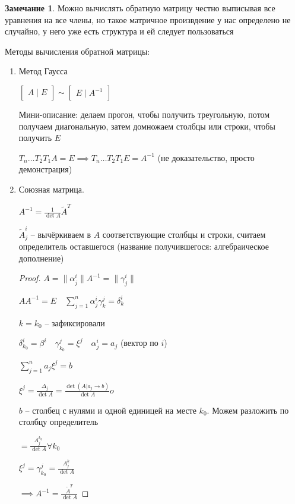 \documentclass{book}
\newcommand{\tl}[1]{\widetilde{#1}}
\theoremstyle{definition}
\newtheorem*{note}{Замечание}
\begin{document}
\begin{note}
    Можно вычислять обратную матрицу честно выписывая все уравнения на все члены, но такое матричное произвдение у нас определено не случайно, у него уже есть структура и ей следует пользоваться
\end{note}

Методы вычисления обратной матрицы:
\begin{enumerate}
    \item Метод Гаусса

        $\begin{bmatrix} A\mid E \end{bmatrix} \sim \begin{bmatrix} E\mid A^{-1} \end{bmatrix} $

         Мини-описание: делаем прогон, чтобы получить треугольную, потом получаем диагональную, затем домножаем столбцы или строки, чтобы получить $E$
         
         $T_n \ldots T_2T_1A = E \implies  T_n\ldots T_2T_1 E = A^{-1}$ (не доказательство, просто демонстрация)
     \item Союзная матрица.

         $A^{-1} = \frac{1}{\det A}\tl A^T$ 

         $\tl A^i_j$ -- вычёркиваем в  $A$ соответствующие столбцы и строки, считаем определитель оставшегося (название получившегося: алгебраическое дополнение)
         \begin{proof}
             $A = \|\alpha^i_j\| A^{-1} = \|\gamma^i_j\|$

             $A A^{-1} = E \quad \sum_{j=1}^{n} \alpha^i_j\gamma^j_k = \delta^i_k$ 

             $k = k_0$ -- зафиксировали

             $\delta^i_{k_0} = \beta^i\quad \gamma^j_{k_0} = \xi^j\quad \alpha^i_j = a_j$ (вектор по $i$)

              $\sum_{j=1}^{n} a_j\xi^j = b$ 

              $\xi^j = \frac{\Delta_j}{\det A} = \frac{\det \left( A| a_j \to b \right) }{\det A}o$ 

              $b$ -- столбец с нулями и одной единицей на месте  $k_0$. Можем разложить по столбцу определитель 

              $ = \frac{A^{k_0}_j}{\det A} \forall k_0$ 

              $\xi^j = \gamma^j_{k_0} = \frac{A_j^k}{\det A}$ 

              $\implies A^{-1} = \frac{\tl A^T}{\det A}$
         \end{proof}
\end{enumerate}
\end{document}
